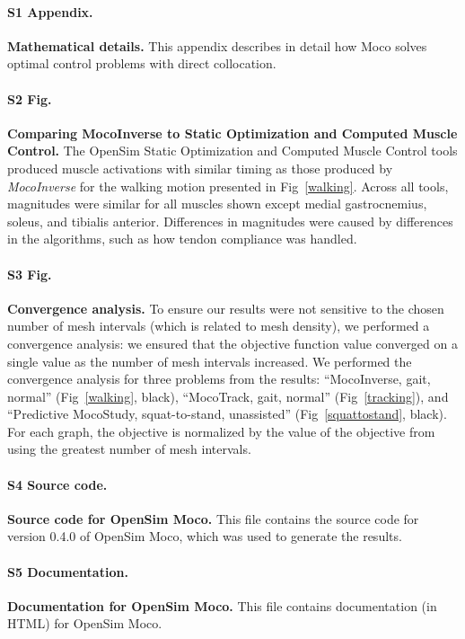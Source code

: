 \documentclass[10pt,letterpaper]{article}
\begin{document}
\paragraph*{S1 Appendix.}
\label{S1_Appendix}
{\bf Mathematical details.} This appendix describes in detail how Moco solves optimal control problems with direct collocation.

\paragraph*{S2 Fig.}
\label{S2_Fig}
{\bf Comparing MocoInverse to Static Optimization and Computed Muscle Control.} The OpenSim Static Optimization and Computed Muscle Control tools produced muscle activations with similar timing as those produced by \textit{MocoInverse} for the walking motion presented in Fig~\ref{walking}. Across all tools, magnitudes were similar for all muscles shown except medial gastrocnemius, soleus, and tibialis anterior. Differences in magnitudes were caused by differences in the algorithms, such as how tendon compliance was handled.

\paragraph*{S3 Fig.}
\label{S3_Fig}
{\bf Convergence analysis.}
To ensure our results were not sensitive to the chosen number of mesh intervals (which is related to mesh density), we performed a convergence analysis: we ensured that the objective function value converged on a single value as the number of mesh intervals increased. We performed the convergence analysis for three problems from the results: ``MocoInverse, gait, normal'' (Fig~\ref{walking}, black), ``MocoTrack, gait, normal'' (Fig~\ref{tracking}), and ``Predictive MocoStudy, squat-to-stand, unassisted'' (Fig~\ref{squattostand}, black). For each graph, the objective is normalized by the value of the objective from using the greatest number of mesh intervals.

\paragraph*{S4 Source code.}
\label{S4_SourceCode}
{\bf Source code for OpenSim Moco.} This file contains the source code for version 0.4.0 of OpenSim Moco, which was used to generate the results.

\paragraph*{S5 Documentation.}
\label{S5_Documentatino}
{\bf Documentation for OpenSim Moco.} This file contains documentation (in HTML) for OpenSim Moco.
\end{document}
